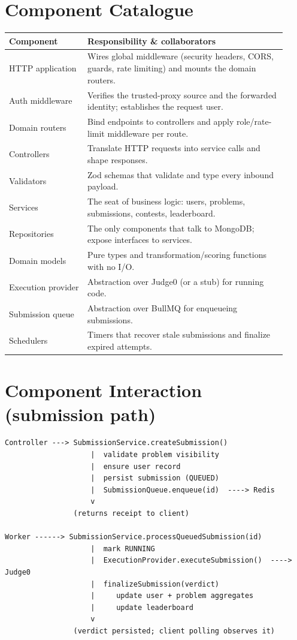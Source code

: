 \documentclass[12pt,a4paper,oneside]{report}
\begin{document}
\section{Component Catalogue}
\begin{longtable}{@{}p{0.26\linewidth} p{0.66\linewidth}@{}}
\toprule
\textbf{Component} & \textbf{Responsibility \& collaborators}\\
\midrule
\endhead
HTTP application & Wires global middleware (security headers, CORS, guards, rate limiting) and mounts the domain routers.\\
Auth middleware & Verifies the trusted-proxy source and the forwarded identity; establishes the request user.\\
Domain routers & Bind endpoints to controllers and apply role/rate-limit middleware per route.\\
Controllers & Translate HTTP requests into service calls and shape responses.\\
Validators & Zod schemas that validate and type every inbound payload.\\
Services & The seat of business logic: users, problems, submissions, contests, leaderboard.\\
Repositories & The only components that talk to MongoDB; expose interfaces to services.\\
Domain models & Pure types and transformation/scoring functions with no I/O.\\
Execution provider & Abstraction over Judge0 (or a stub) for running code.\\
Submission queue & Abstraction over BullMQ for enqueueing submissions.\\
Schedulers & Timers that recover stale submissions and finalize expired attempts.\\
\bottomrule
\end{longtable}

\section{Component Interaction (submission path)}
\begin{lstlisting}[language={}]
Controller ---> SubmissionService.createSubmission()
                    |  validate problem visibility
                    |  ensure user record
                    |  persist submission (QUEUED)
                    |  SubmissionQueue.enqueue(id)  ----> Redis
                    v
                (returns receipt to client)

Worker ------> SubmissionService.processQueuedSubmission(id)
                    |  mark RUNNING
                    |  ExecutionProvider.executeSubmission()  ----> Judge0
                    |  finalizeSubmission(verdict)
                    |     update user + problem aggregates
                    |     update leaderboard
                    v
                (verdict persisted; client polling observes it)
\end{lstlisting}
\end{document}

